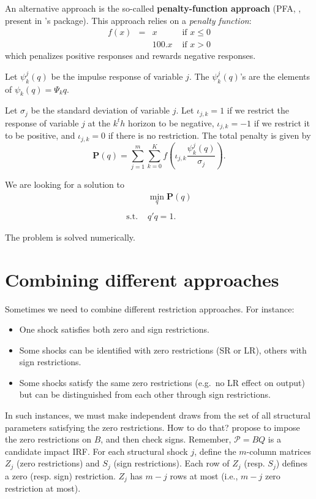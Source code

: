 \documentclass[
  12pt,
]{book}
\providecommand{\tightlist}{%
  \setlength{\itemsep}{0pt}\setlength{\parskip}{0pt}}
\theoremstyle{definition}
\theoremstyle{definition}
\theoremstyle{definition}
\theoremstyle{definition}
\theoremstyle{remark}
\begin{document}
An alternative approach is the so-called \textbf{penalty-function approach} (PFA, \citet{Uhlig_2005}, present in \citet{Danne_2015}'s package). This approach relies on a \emph{penalty function}:
\[
\begin{array}{llll}f(x)&=&x&\text{ if }x\le0\\
&&100.x&\text{ if }x>0\end{array}
\]
which penalizes positive responses and rewards negative responses.

Let \(\psi_k^j(q)\) be the impulse response of variable \(j\). The \(\psi_k^j(q)\)'s are the elements of \(\psi_k(q)=\Psi_kq\).

Let \(\sigma_j\) be the standard deviation of variable \(j\). Let \(\iota_{j,k}=1\) if we restrict the response of variable \(j\) at the \(k^th\) horizon to be negative, \(\iota_{j,k}=-1\) if we restrict it to be positive, and \(\iota_{j,k}=0\) if there is no restriction. The total penalty is given by \[
\mathbf{P}(q)=\sum_{j=1}^m\sum_{k=0}^Kf\left(\iota_{j,k}\frac{\psi_k^j(q)}{\sigma_j}\right).
\]

We are looking for a solution to
\[\begin{array}{ll}&\min_q \mathbf{P}(q)\\
&\\
\text{s.t. }&q'q=1.\end{array}\]

The problem is solved numerically.

\hypertarget{combining-different-approaches}{%
\section{Combining different approaches}\label{combining-different-approaches}}

Sometimes we need to combine different restriction approaches. For instance:

\begin{itemize}
\tightlist
\item
  One shock satisfies both zero and sign restrictions.
\item
  Some shocks can be identified with zero restrictions (SR or LR), others with sign restrictions.
\item
  Some shocks satisfy the same zero restrictions (e.g.~no LR effect on output) but can be distinguished from each other through sign restrictions.
\end{itemize}

In such instances, we must make independent draws from the set of all structural parameters satisfying the zero restrictions. How to do that? \citet{Arias_et_al_2018} propose to impose the zero restrictions on \(B\), and then check signs. Remember, \(\mathcal{P}=BQ\) is a candidate impact IRF. For each structural shock \(j\), define the \(m\)-column matrices \(Z_j\) (zero restrictions) and \(S_j\) (sign restrictions). Each row of \(Z_j\) (resp. \(S_j\)) defines a zero (resp. sign) restriction. \(Z_j\) has \(m-j\) rows at most (i.e., \(m-j\) zero restriction at most).
\end{document}
